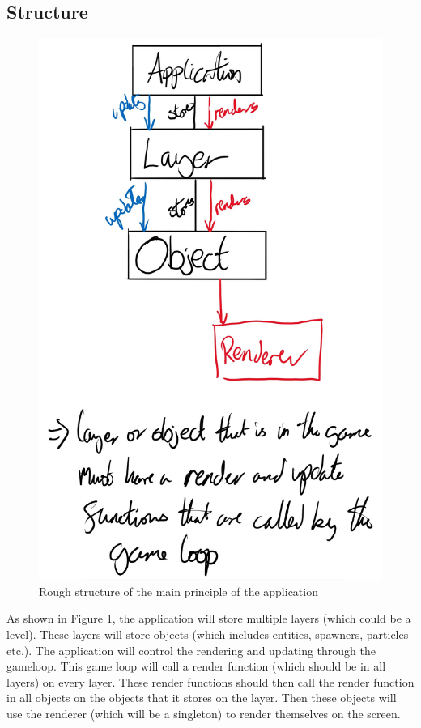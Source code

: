\documentclass[../Main.tex]{subfiles}
\begin{document}
    \subsection{Structure}
        \begin{figure}[hbt!]
            \centerline{\includegraphics[scale=0.5]{img/Design/Struture.jpg}}
            \caption{Rough structure of the main principle of the application}
            \label{fig:Structure}
        \end{figure}
        As shown in Figure \ref{fig:Structure}, the application will store multiple layers (which could be a level). These layers will store objects (which includes entities, spawners, particles etc.). The application will control the rendering and updating through the gameloop. This game loop will call a render function (which should be in all layers) on every layer. These render functions should then call the render function in all objects on the objects that it stores on the layer. Then these objects will use the renderer (which will be a singleton) to render themselves on the screen.
\end{document}

